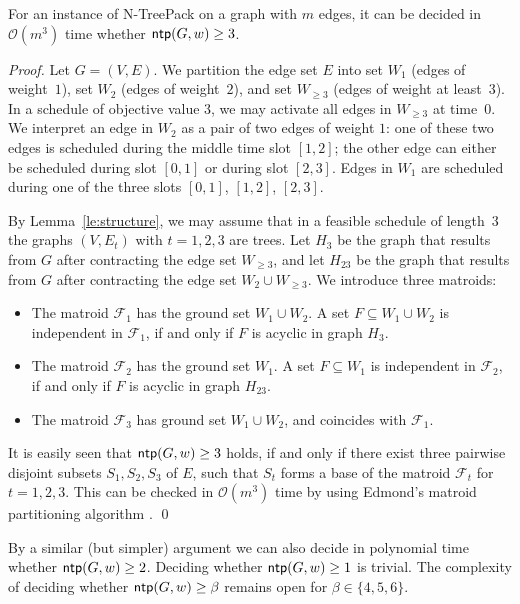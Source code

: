 \documentclass[runningheads]{llncs}
\newcommand{\bigO}{\mathcal{O}}
\newcommand{\xxxNTP}{{\sc N-TreePack}}
\DeclareMathOperator{\ntp}{\text{\sf ntp}}
\begin{document}
\begin{theorem}
\label{th:value=3}
For an instance of {\xxxNTP} on a graph with $m$ edges, it can be decided in $\bigO(m^3)$ time 
whether $\ntp(G,w)\ge3$.
\end{theorem}
\begin{proof}
Let $G=(V,E)$. 
We partition the edge set $E$ into set $W_1$ (edges of weight~$1$), set $W_2$ (edges of weight~$2$),
and set $W_{\ge3}$ (edges of weight at least~$3$).
In a schedule of objective value $3$, we may activate all edges in $W_{\ge3}$ at time~$0$.
We interpret an edge in $W_2$ as a pair of two edges of weight $1$: one of these two edges is scheduled 
during the middle time slot $[1, 2]$; the other edge can either be scheduled during slot $[0,1]$ 
or during slot $[2,3]$. 
Edges in $W_1$ are scheduled during one of the three slots $[0,1]$, $[1,2]$, $[2,3]$.

By Lemma~\ref{le:structure}, we may assume that in a feasible schedule of length~$3$ the 
graphs $(V,E_t)$ with $t=1,2,3$ are trees.
Let $H_3$    be the graph that results from $G$ after contracting the edge set $W_{\ge3}$, and
let $H_{23}$ be the graph that results from $G$ after contracting the edge set $W_2\cup W_{\ge3}$.
We introduce three matroids:
\begin{itemize}
\item The matroid $\mathcal{F}_1$ has the ground set $W_1\cup W_2$. 
A set $F\subseteq W_1\cup W_2$ is independent in $\mathcal{F}_1$, if and only if $F$ is acyclic in graph $H_3$.
\item The matroid $\mathcal{F}_2$ has the ground set $W_1$.
A set $F\subseteq W_1$ is independent in $\mathcal{F}_2$, if and only if $F$ is acyclic in graph $H_{23}$.
\item The matroid $\mathcal{F}_3$ has ground set $W_1\cup W_2$, and coincides with $\mathcal{F}_1$.
\end{itemize}
It is easily seen that $\ntp(G,w)\ge3$ holds, if and only if there exist three pairwise disjoint subsets
$S_1,S_2,S_3$ of $E$, such that $S_t$ forms a base of the matroid $\mathcal{F}_t$ for $t=1,2,3$.
This can be checked in $\bigO(m^3)$ time by using Edmond's matroid partitioning algorithm \cite{edmonds1965minimum}.
\qed
\end{proof}

By a similar (but simpler) argument we can also decide in polynomial time whether $\ntp(G,w)\ge2$.
Deciding whether $\ntp(G,w)\ge1$ is trivial.
The complexity of deciding whether $\ntp(G,w)\ge\beta$ remains open for $\beta\in\{4,5,6\}$.
\end{document}
